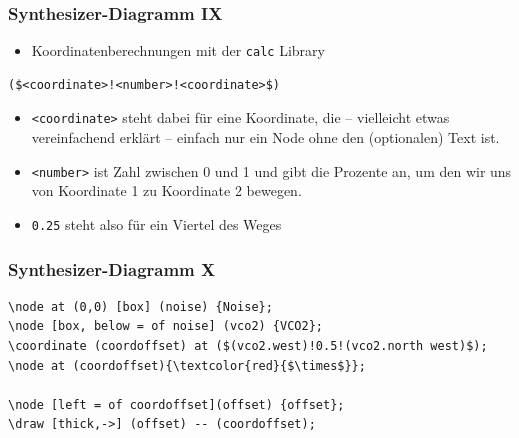 \documentclass[14pt,ngerman]{beamer}
\begin{document}
\begin{frame}[containsverbatim]
\frametitle{Synthesizer-Diagramm IX}

\begin{itemize}
\item Koordinatenberechnungen mit der \texttt{calc} Library
\end{itemize}

\begin{lstlisting}
($<coordinate>!<number>!<coordinate>$)
\end{lstlisting}

\begin{itemize}
	\item \texttt{<coordinate>} steht dabei für eine Koordinate, die -- vielleicht etwas vereinfachend erklärt -- einfach nur ein Node ohne den (optionalen) Text ist.
	\item  \texttt{<number>} ist Zahl zwischen 0 und 1 und gibt die Prozente an, um den wir uns von Koordinate 1 zu Koordinate 2 bewegen. 
	\item  \texttt{0.25} steht also für ein Viertel des Weges 
\end{itemize}

\end{frame}

\begin{frame}[containsverbatim]
\frametitle{Synthesizer-Diagramm X}


\begin{lstlisting}
\node at (0,0) [box] (noise) {Noise};
\node [box, below = of noise] (vco2) {VCO2};
\coordinate (coordoffset) at ($(vco2.west)!0.5!(vco2.north west)$);
\node at (coordoffset){\textcolor{red}{$\times$}};

\node [left = of coordoffset](offset) {offset};
\draw [thick,->] (offset) -- (coordoffset);
\end{lstlisting}

\begin{center}
\end{center}

\end{frame}
\end{document}
